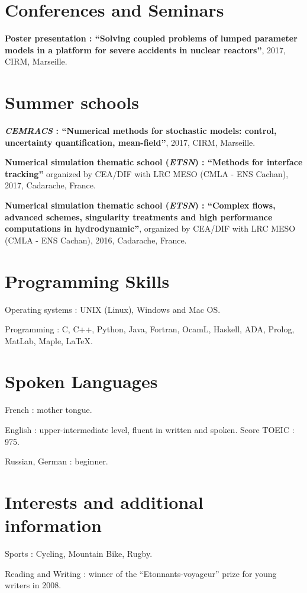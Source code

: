 \documentclass{article}
\renewenvironment{itemize}{
  \begin{list}{}{
      \setlength{\leftmargin}{1.5em}
      \setlength{\itemsep}{0.25em}
      \setlength{\parskip}{0pt}
      \setlength{\parsep}{0.25em}
    }
}{
  \end{list}
}
\begin{document}
\section*{Conferences and Seminars}
\begin{itemize}
	\item \textbf{Poster presentation : ``Solving coupled problems of lumped parameter models in a platform for severe accidents in nuclear reactors''}, 2017, CIRM, Marseille.
\end{itemize}  

\section*{Summer schools}
\begin{itemize}
	\item \textbf{\textit{CEMRACS} : ``Numerical methods for stochastic models: control, uncertainty quantification, mean-field''}, 2017, CIRM, Marseille.
	\item \textbf{Numerical simulation thematic school (\textit{ETSN}) : ``Methods for interface tracking''} organized by CEA/DIF with LRC MESO (CMLA - ENS Cachan), 2017, Cadarache, France.
	\item \textbf{Numerical simulation thematic school (\textit{ETSN}) : ``Complex flows, advanced schemes, singularity treatments and high performance computations in hydrodynamic''}, organized by CEA/DIF with LRC MESO (CMLA - ENS Cachan), 2016, Cadarache, France.
\end{itemize}  

\section*{Programming Skills}
\begin{itemize}
	\item Operating systems : UNIX (Linux), Windows and Mac OS.
	\item Programming : C, C++, Python, Java, Fortran, OcamL, Haskell, ADA, Prolog, MatLab, Maple, \LaTeX. 
\end{itemize}  

\section*{Spoken Languages}
\begin{itemize}
	\item French : mother tongue.
	\item English : upper-intermediate level, fluent in written and spoken. Score TOEIC : 975.
	\item Russian, German : beginner.
\end{itemize}
\section*{Interests and additional information}
\begin{itemize}
	\item Sports : Cycling, Mountain Bike, Rugby.
	\item Reading and Writing : winner of the ``Etonnants-voyageur'' prize for young writers in 2008.
\end{itemize}  
\end{document}
